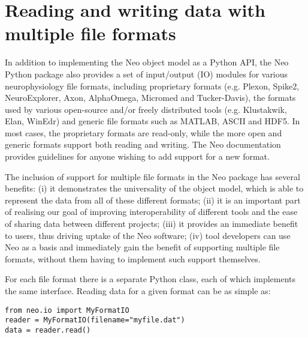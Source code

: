 \documentclass{frontiers}
\begin{document}
\section{Reading and writing data with multiple file formats}


In addition to implementing the Neo object model as a Python API, the Neo Python package also provides a set of input/output (IO) modules for various neurophysiology file formats, including proprietary formats (e.g. Plexon, Spike2, NeuroExplorer, Axon, AlphaOmega, Micromed and Tucker-Davis), the formats used by various open-source and/or freely distributed tools (e.g. Klustakwik, Elan, WinEdr) and generic file formats such as MATLAB, ASCII and HDF5. 
In most cases, the proprietary formats are read-only, while the more open and generic formats support both reading and writing. The Neo documentation provides guidelines for anyone wishing to add support for a new format.

The inclusion of support for multiple file formats in the Neo package has several benefits:
(i) it demonstrates the universality of the object model, which is able to represent the data from all of these different formats;
(ii) it is an important part of realising our goal of improving interoperability of different tools and the ease of sharing data between different projects;
(iii) it provides an immediate benefit to users, thus driving uptake of the Neo software;
(iv) tool developers can use Neo as a basis and immediately gain the benefit of supporting multiple file formats, without them having to implement such support themselves.


For each file format there is a separate Python class, each of which implements the same interface. Reading data for a given format can be as simple as:

\begin{lstlisting}[style=display]
from neo.io import MyFormatIO
reader = MyFormatIO(filename="myfile.dat")
data = reader.read()
\end{lstlisting}
\end{document}
